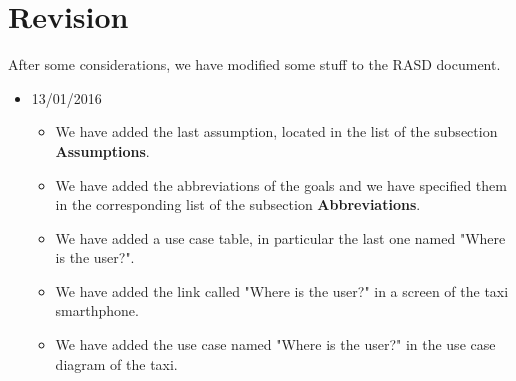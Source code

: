 \section{Revision}
After some considerations, we have modified some stuff to the RASD document.
\begin{itemize}
	\item 13/01/2016
\begin{itemize}
    \item We have added the last assumption, located in the list of the subsection \textbf{Assumptions}.
    \item We have added the abbreviations of the goals and we have specified them in the corresponding list of the subsection \textbf{Abbreviations}.
    \item We have added a use case table, in particular the last one named "Where is the user?".
    \item We have added the link called "Where is the user?" in a screen of the taxi smarthphone.
    \item We have added the use case named "Where is the user?" in the use case diagram of the taxi.
\end{itemize}
\end{itemize}